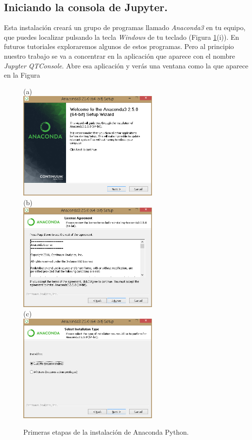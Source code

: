 \documentclass[10pt,a4paper]{article}\usepackage[]{graphicx}\usepackage[]{color}
\begin{document}
\subsection{Iniciando la consola de Jupyter.}
\label{tut02py:subsec:iniciandoConsolaJupyter}

Esta instalación creará un grupo de programas llamado {\em Anaconda3} en tu equipo, que puedes localizar pulsando la tecla {\em Windows} de tu teclado (Figura \ref{cap01:fig:Tut-00-py-03-Anaconda}(i)). En futuros tutoriales exploraremos algunos de estos programas. Pero al principio nuestro trabajo se va a concentrar en la aplicación que aparece con el nombre {\em Jupyter QTConsole}. Abre esa aplicación y verás una ventana como la que aparece en la Figura


\begin{figure}[p]
\begin{center}
(a)\\[1cm]
\includegraphics[width=7cm]{../fig/Tut-00-py-03-Anaconda.png}\\[1cm]
(b)\\[1cm]
\includegraphics[width=7cm]{../fig/Tut-00-py-04-Anaconda.png}\\[1cm]
(c)\\[1cm]
\includegraphics[width=7cm]{../fig/Tut-00-py-05-Anaconda.png}\\[1cm]
\caption{Primeras etapas de la instalación de Anaconda Python.}
\label{cap01:fig:Tut-00-py-03-Anaconda}
\end{center}
\end{figure}
\end{document}
